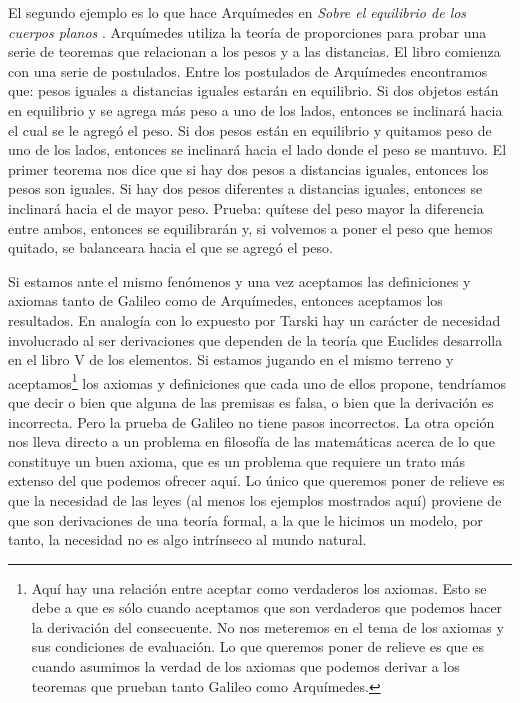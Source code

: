 El segundo ejemplo es lo que hace Arquímedes en \emph{Sobre el equilibrio de los cuerpos planos} \cite{Archimedes1897}. Arquímedes utiliza la teoría de proporciones para probar una serie de teoremas que relacionan a los pesos y a las distancias. El libro comienza con una serie de postulados. Entre los postulados de Arquímedes encontramos que: pesos iguales a distancias iguales estarán en equilibrio. Si dos objetos están en equilibrio y se agrega más peso a uno de los lados, entonces se inclinará hacia el cual se le agregó el peso. Si dos pesos están en equilibrio y quitamos peso de uno de los lados, entonces se inclinará hacia el lado donde el peso se mantuvo. El primer teorema nos dice que si hay dos pesos a distancias iguales, entonces los pesos son iguales. Si hay dos pesos diferentes a distancias iguales, entonces se inclinará hacia el de mayor peso. Prueba: quítese del peso mayor la diferencia entre ambos, entonces se equilibrarán y, si volvemos a poner el peso que hemos quitado, se balanceara hacia el que se agregó el peso.

Si estamos ante el mismo fenómenos y una vez aceptamos las definiciones y axiomas tanto de Galileo como de Arquímedes, entonces aceptamos los resultados. En analogía con lo expuesto por Tarski hay un carácter de necesidad involucrado al ser derivaciones que dependen de la teoría que Euclides desarrolla en el libro V de los elementos. Si estamos jugando en el mismo terreno y aceptamos\footnote{Aquí hay una relación entre aceptar como verdaderos los axiomas. Esto se debe a que es sólo cuando aceptamos que son verdaderos que podemos hacer la derivación del consecuente. No nos meteremos en el tema de los axiomas y sus condiciones de evaluación. Lo que queremos poner de relieve es que es cuando asumimos la verdad de los axiomas que podemos derivar a los teoremas que prueban tanto Galileo como Arquímedes.} los axiomas y definiciones que cada uno de ellos propone, tendríamos que decir o bien que alguna de las premisas es falsa, o bien que la derivación es incorrecta. Pero la prueba de Galileo no tiene pasos incorrectos. La otra opción nos lleva directo a un problema en filosofía de las matemáticas acerca de lo que constituye un buen axioma, que es un problema que requiere un trato más extenso del que podemos ofrecer aquí. Lo único que queremos poner de relieve es que la necesidad de las leyes (al menos los ejemplos mostrados aquí) proviene de que son derivaciones de una teoría formal, a la que le hicimos un modelo, por tanto, la necesidad no es algo intrínseco al mundo natural.

